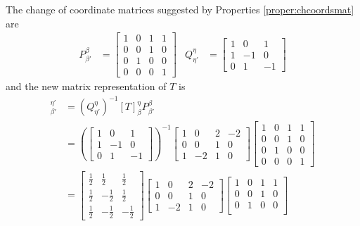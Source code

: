 \begin{solution}
The change of coordinate matrices suggested by Properties \ref{proper:chcoordsmat} are
\begin{align*}
P_{\beta'}^\beta &= 
\begin{bmatrix}
1 & 0 & 1 & 1 \\
0 & 0 & 1 & 0 \\
0 & 1 & 0 & 0 \\
0 & 0 & 0 & 1
\end{bmatrix}
&
Q_{\eta'}^\eta &= 
\begin{bmatrix}
1 & 0 & 1 \\
1 & -1 & 0 \\
0 & 1 & -1
\end{bmatrix}
\end{align*}
and the new matrix representation of $T$ is
\begin{align*}
[T]_{\beta'}^{\eta'} &= (Q_{\eta'}^\eta)^{-1} [T]_\beta^\eta P_{\beta'}^\beta \\
&= \left(\begin{bmatrix}
1 & 0 & 1 \\
1 & -1 & 0 \\
0 & 1 & -1
\end{bmatrix}\right)^{-1}
\begin{bmatrix}
1 & 0 & 2 & -2 \\
0 & 0 & 1 & 0 \\
1 & -2 & 1 & 0
\end{bmatrix}
\begin{bmatrix}
1 & 0 & 1 & 1 \\
0 & 0 & 1 & 0 \\
0 & 1 & 0 & 0 \\
0 & 0 & 0 & 1
\end{bmatrix} \\
&= \begin{bmatrix}
\frac{1}{2} & \frac{1}{2} & \frac{1}{2} \\
\frac{1}{2} & -\frac{1}{2} & \frac{1}{2} \\
\frac{1}{2} & -\frac{1}{2} & -\frac{1}{2}
\end{bmatrix}
\begin{bmatrix}
1 & 0 & 2 & -2 \\
0 & 0 & 1 & 0 \\
1 & -2 & 1 & 0
\end{bmatrix}
\begin{bmatrix}
1 & 0 & 1 & 1 \\
0 & 0 & 1 & 0 \\
0 & 1 & 0 & 0 \\

\end{bmatrix}
\end{align*}
\end{solution}
